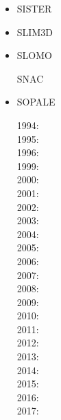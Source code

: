 \begin{itemize}
\item SISTER

\cite{olbm16}

\item SLIM3D

\cite{poso08}
\cite{qusp10}
\cite{brps12}
\cite{brps13}
\cite{brau13}
\cite{brun14}
\cite{hebr14}
\cite{kobf14}
\cite{clbq15}

\item SLOMO
\cite{kaus05}

\index SNAC
\cite{chlg08}


\item SOPALE

1994: \cite{wibe94}\cite{befh94}\\
1995: \cite{full95}\cite{elfb95}\\
1996: \cite{bekh96}\\
1999: \cite{will99a}\cite{will99b}\\
2000: \cite{pybf00}\cite{bemh00}\\
2001: \cite{bejn01}\\
2002: \cite{hube02}\cite{pybf02}\\
2003: \cite{hube03}\cite{vamf03}\cite{wipo03}\cite{pymi03}\\
2004: \cite{bejn04}\cite{pycr04}\cite{pybe04}\cite{elsp04}\cite{geim04}\\
2005: \cite{gebi05}\cite{hubb05}\\
2006: \cite{pysk06}\cite{selz06}\\
2007: \cite{hube07}\cite{cubh07}\cite{mohb07}\\
2008: \cite{sebp08}\cite{wabj08}\cite{wabj08b}\cite{gopy08}\\
2009: \cite{kecw09}\cite{bejb09}\cite{bupb09}\cite{grba09}\cite{sihb09}\\
2010: \cite{albs10}\cite{albe10}\cite{grpy10}\cite{pygp10}\\
2011: \cite{cube11}\cite{bubj11}\cite{hube11}\\
2012: \cite{grpy12}\cite{grpy12b}\cite{kogp12}\cite{grbe12}\cite{jahu12}\\
2013: \cite{bubj13}\cite{chbe13}\cite{fihv13a}\cite{fihv13b}\cite{gobi13}\cite{grpy13}\cite{knak13}\cite{nipc13}\cite{jahm13}\\
2014: \cite{gogu14}\\
2015: \cite{albe15}\cite{bubj15}\cite{heps15}\\
2016: \cite{licu16}\\
2017: \cite{bube17}



\end{itemize}
